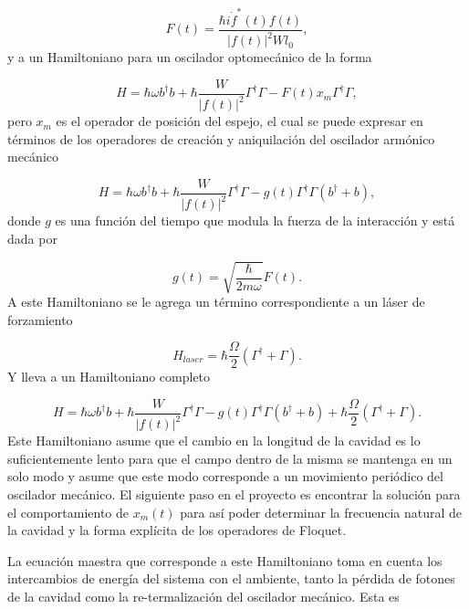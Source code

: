 \documentclass[10pt,a4paper]{report}
\begin{document}
\begin{equation}
F(t) = \frac{\hbar i\dot{f}^*(t)f(t) }{|f(t)|^2W l_0},
\end{equation} y a un Hamiltoniano para un oscilador optomecánico de la forma

\begin{equation}
H = \hbar \omega b^\dagger b + \hbar\frac{ W}{|f(t)|^2}\Gamma^\dagger \Gamma -F(t)x_m\Gamma^\dagger \Gamma,
\end{equation} pero $x_m$ es el operador de posición del espejo, el cual se puede expresar en términos de los operadores de creación y aniquilación del oscilador armónico mecánico

\begin{equation}
H = \hbar \omega b^\dagger b + \hbar\frac{ W}{|f(t)|^2}\Gamma^\dagger \Gamma -g(t)\Gamma^\dagger \Gamma(b^\dagger + b),
\end{equation} donde $g$ es una función del tiempo que modula la fuerza de la interacción y está dada por

\begin{equation}
g(t) = \sqrt{\frac{\hbar}{2m\omega}}F(t).
\end{equation} 
A este Hamiltoniano se le agrega un término correspondiente a un láser de forzamiento

\begin{equation}
H_{laser}= \hbar \frac{\Omega}{2}(\Gamma^\dagger + \Gamma).
\end{equation} Y lleva a un Hamiltoniano completo

\begin{equation}
H = \hbar \omega b^\dagger b + \hbar\frac{ W}{|f(t)|^2}\Gamma^\dagger \Gamma -g(t)\Gamma^\dagger \Gamma(b^\dagger + b) + \hbar \frac{\Omega}{2}(\Gamma^\dagger + \Gamma).
\end{equation} Este Hamiltoniano asume que el cambio en la longitud de la cavidad es lo suficientemente lento para que el campo dentro de la misma se mantenga en un solo modo y asume que este modo corresponde a un movimiento periódico del oscilador mecánico. El siguiente paso en el proyecto es encontrar la solución para el comportamiento de $x_m(t)$ para así poder determinar la frecuencia natural de la cavidad y la forma explícita de los operadores de Floquet.


 La ecuación maestra que corresponde a este Hamiltoniano toma en cuenta los intercambios de energía del sistema con el ambiente, tanto la pérdida de fotones de la cavidad como la re-termalización del oscilador mecánico. Esta es \cite{BarberisLC}
\end{document}
